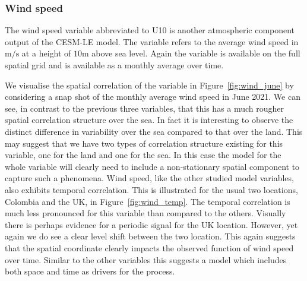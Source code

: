 \subsubsection{Wind speed \label{sssec:wind}}
The wind speed variable  abbreviated to U10 is another atmospheric component output of the CESM-LE model.
The variable refers to the average wind speed in $\si{\meter\per\second}$ at a height of $10\si{\meter}$ above sea level.
Again the variable is available on the full spatial grid and is available as a monthly average over time.

We visualise the spatial correlation of the variable in Figure~\ref{fig:wind_june} by considering a snap shot of the monthly average wind speed in June 2021.
We can see, in contrast to the previous three variables, that this has a much rougher spatial correlation structure over the sea. 
In fact it is interesting to observe the distinct difference in variability over the sea compared to that over the land. 
This may suggest that we have two types of correlation structure existing for this variable, one for the land and one for the sea. 
In this case the model for the whole variable will clearly need to include a non-stationary spatial component to capture such a phenomena.
Wind speed, like the other studied model variables, also exhibits temporal correlation. 
This is illustrated for the usual two locations, Colombia and the UK, in Figure~\ref{fig:wind_temp}. 
The temporal correlation is much less pronounced for this variable than compared to the others. 
Visually there is perhaps evidence for a periodic signal for the UK location. 
However, yet again we do see a clear level shift between the two location. 
This again suggests that the spatial coordinate clearly impacts the observed function of wind speed over time.
Similar to the other variables this suggests a model which includes both space and time as drivers for the process.


